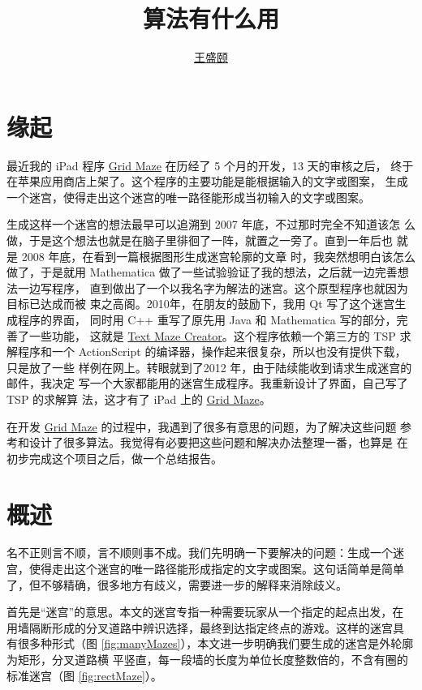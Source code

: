 \documentclass[cs4size,a4paper,adobefonts]{ctexart}
\newcommand{\GridMaze}{\href{http://itunes.apple.com/app/grid-maze/id553265800?mt=8}{Grid Maze}}
\begin{document}
\title{\bfseries 算法有什么用}
\author{\href{mailto:txyyss@gmail.com}{王盛颐}}
\date{}
\maketitle

\section*{缘起}
最近我的 iPad 程序 \GridMaze{} 在历经了 5 个月的开发，13 天的审核之后，
终于在苹果应用商店上架了。这个程序的主要功能是能根据输入的文字或图案，
生成一个迷宫，使得走出这个迷宫的唯一路径能形成当初输入的文字或图案。

生成这样一个迷宫的想法最早可以追溯到 2007 年底，不过那时完全不知道该怎
么做，于是这个想法也就是在脑子里徘徊了一阵，就置之一旁了。直到一年后也
就是 2008 年底，在看到一篇根据图形生成迷宫轮廓的文章
\cite{Xu:2007:ImageMaze}时，我突然想明白该怎么做了，于是就用
Mathematica 做了一些试验验证了我的想法，之后就一边完善想法一边写程序，
直到做出了一个以我名字为解法的迷宫。这个原型程序也就因为目标已达成而被
束之高阁。2010年，在朋友的鼓励下，我用 Qt 写了这个迷宫生成程序的界面，
同时用 C++ 重写了原先用 Java 和 Mathematica 写的部分，完善了一些功能，
这就是
\href{https://sites.google.com/site/txyyss/projects/text-maze-creator}{Text
  Maze Creator}。这个程序依赖一个第三方的 TSP 求解程序和一个
ActionScript 的编译器，操作起来很复杂，所以也没有提供下载，只是放了一些
样例在网上。转眼就到了2012 年，由于陆续能收到请求生成迷宫的邮件，我决定
写一个大家都能用的迷宫生成程序。我重新设计了界面，自己写了 TSP 的求解算
法，这才有了 iPad 上的 \GridMaze。

在开发 \GridMaze{} 的过程中，我遇到了很多有意思的问题，为了解决这些问题
参考和设计了很多算法。我觉得有必要把这些问题和解决办法整理一番，也算是
在初步完成这个项目之后，做一个总结报告。

\section{概述}
名不正则言不顺，言不顺则事不成。我们先明确一下要解决的问题：生成一个迷
宫，使得走出这个迷宫的唯一路径能形成指定的文字或图案。这句话简单是简单
了，但不够精确，很多地方有歧义，需要进一步的解释来消除歧义。

首先是“迷宫”的意思。本文的迷宫专指一种需要玩家从一个指定的起点出发，在
用墙隔断形成的分叉道路中辨识选择，最终到达指定终点的游戏。这样的迷宫具
有很多种形式（图 \ref{fig:manyMazes}），本文进一步明确我们要生成的迷宫是外轮廓为矩形，分叉道路横
平竖直，每一段墙的长度为单位长度整数倍的，不含有圈的标准迷宫（图 \ref{fig:rectMaze}）。
\end{document}
